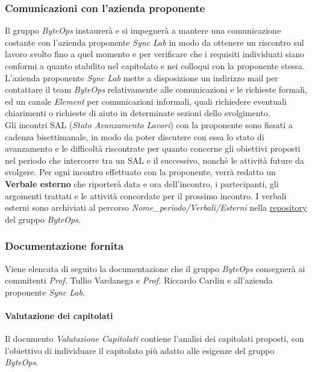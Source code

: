 \subsubsection{Comunicazioni con l'azienda proponente}
Il gruppo \textit{ByteOps} instaurerà e si impegnerà a mantere una comunicazione costante con l'azienda proponente \textit{Sync Lab} in modo da ottenere un riscontro sul lavoro svolto fino a quel momento e per verificare che i requisiti individuati siano conformi a quanto stabilito nel capitolato e nei colloqui con la proponente stessa.\\
L'azienda proponente \textit{Sync Lab} mette a disposizione un indirizzo mail per contattare il team \textit{ByteOps} relativamente alle comunicazioni e le richieste formali, ed un canale \textit{Element} per comunicazioni informali, quali richiedere eventuali chiarimenti o richieste di aiuto in determinate sezioni dello svolgimento.\\
Gli incontri SAL (\textit{Stato Avanzamento Lavori}) con la proponente sono fissati a cadenza bisettimanale, in modo da poter discutere con essa lo stato di avanzamento e le difficoltà riscontrate per quanto concerne gli obiettivi proposti nel periodo che intercorre tra un SAL e il successivo, nonchè le attività future da svolgere.
Per ogni incontro effettuato con la proponente, verrà redatto un \textbf{Verbale esterno} che riporterà data e ora dell'incontro, i partecipanti, gli argomenti trattati e le attività concordate per il prossimo incontro.
I verbali esterni sono archiviati al percorso \textit{Nome\_periodo/Verbali/Esterni} nella \href{https://github.com/ByteOps-swe/Documents}{repository} del gruppo \textit{ByteOps}.

\subsubsection {Documentazione fornita}
Viene elencata di seguito la documentazione che il gruppo \textit{ByteOps} consegnerà ai commitenti \textit{Prof.} Tullio Vardanega e \textit{Prof.} Riccardo Cardin e all'azienda proponente \textit{Sync Lab}.

\paragraph{Valutazione dei capitolati}
Il documento \textit{Valutazione Capitolati} contiene l'analisi dei capitolati proposti, con l'obiettivo di individuare il capitolato più adatto alle esigenze del gruppo \textit{ByteOps}.

